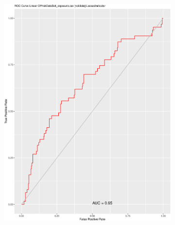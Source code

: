 \documentclass{DissertateUSU}
\begin{document}
\begin{figure}
\centering
\begin{subfigure}[b]{0.5\textwidth}
   \includegraphics[width=1\linewidth]{ROC_Curve_testing.eps}
   \caption{}
   \label{ROC_Validation_dataset} 
\end{subfigure}


\end{figure}
\end{document}
